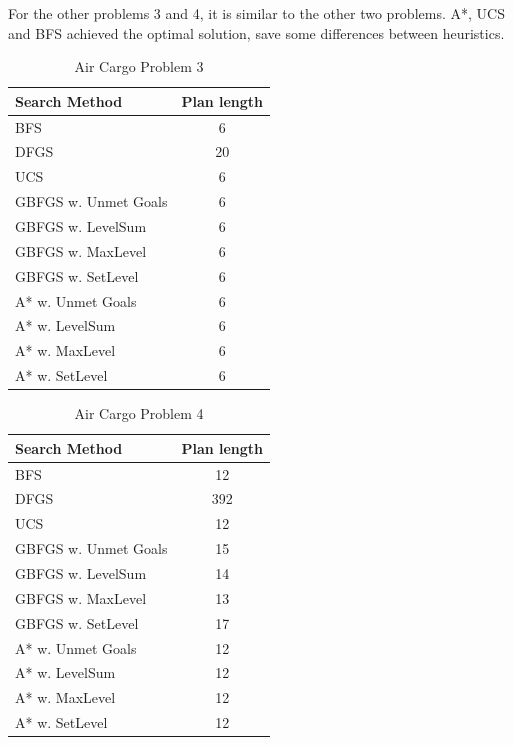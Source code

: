 \documentclass[a4paper]{article}
\begin{document}
For the other problems 3 and 4, it is similar to the other two problems. A*, UCS and BFS achieved the optimal solution, save some differences between heuristics. 
    
\begin{table}[htpb]
    \caption{Air Cargo Problem 3}
    \centering
    \begin{tabular}{ l | c }
    Search Method & Plan length \\ \hline 
BFS & 6 \\
DFGS & 20 \\
UCS & 6 \\
GBFGS w. Unmet Goals & 6 \\
GBFGS w. LevelSum & 6 \\
GBFGS w. MaxLevel & 6 \\
GBFGS w. SetLevel & 6 \\
A* w. Unmet Goals & 6 \\
A* w. LevelSum & 6 \\
A* w. MaxLevel & 6 \\
A* w. SetLevel & 6
\end{tabular}
    \label{airps3}
    \end{table}

    
\begin{table}[htpb]
    \caption{Air Cargo Problem 4}
    \centering
    \begin{tabular}{ l | c }
    Search Method & Plan length \\ \hline 
BFS & 12 \\
DFGS & 392 \\
UCS & 12 \\
GBFGS w. Unmet Goals & 15 \\
GBFGS w. LevelSum & 14 \\
GBFGS w. MaxLevel & 13 \\
GBFGS w. SetLevel & 17 \\
A* w. Unmet Goals & 12 \\
A* w. LevelSum & 12 \\
A* w. MaxLevel & 12 \\
A* w. SetLevel & 12
\end{tabular}
    \label{airps4}
    \end{table}
    
\newpage
\end{document}
